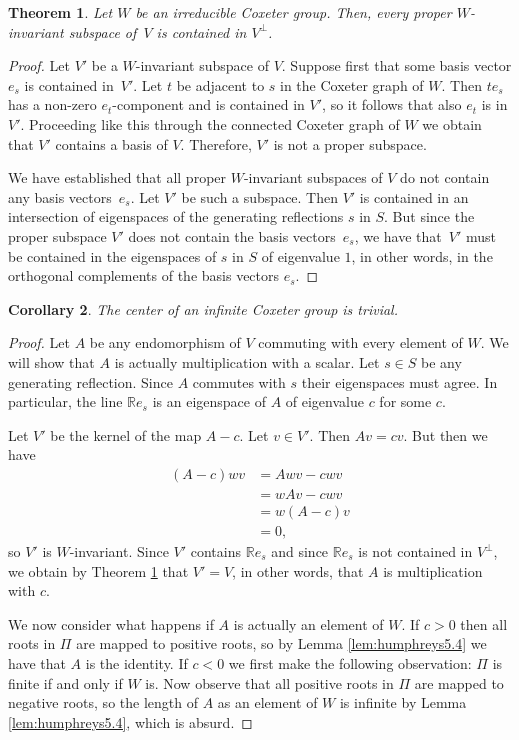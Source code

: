 \documentclass{article}
\newtheorem{theorem}{Theorem}[section]
\newtheorem{corollary}[theorem]{Corollary}
\theoremstyle{definition}
\begin{document}
\begin{theorem}\label{thm:invariant-subspaces}
Let $W$ be an irreducible Coxeter group. Then, every proper $W$-invariant subspace of~$V$ is contained in $V^\perp$.
\end{theorem}

\begin{proof}
Let $V'$ be a $W$-invariant subspace of $V$. Suppose first that some basis vector $e_s$ is contained in~$V'$. Let $t$ be adjacent to $s$ in the Coxeter graph of $W$. Then $te_s$ has a non-zero $e_t$-component and is contained in $V'$, so it follows that also $e_t$ is in $V'$. Proceeding like this through the connected Coxeter graph of $W$ we obtain that $V'$ contains a basis of $V$. Therefore, $V'$ is not a proper subspace.

We have established that all proper $W$-invariant subspaces of $V$ do not contain any basis vectors~$e_s$. Let $V'$ be such a subspace. Then $V'$ is contained in an intersection of eigenspaces of the generating reflections $s$ in $S$. But since the proper subspace $V'$ does not contain the basis vectors~$e_s$, we have that~$V'$ must be contained in the eigenspaces of $s$ in $S$ of eigenvalue $1$, in other words, in the orthogonal complements of the basis vectors $e_s$.
\end{proof}

\begin{corollary}
The center of an infinite Coxeter group is trivial.
\end{corollary}

\begin{proof}
Let $A$ be any endomorphism of $V$ commuting with every element of $W$. We will show that $A$ is actually multiplication with a scalar. Let $s \in S$ be any generating reflection. Since $A$ commutes with $s$ their eigenspaces must agree. In particular, the line $\mathbb{R}e_s$ is an eigenspace of $A$ of eigenvalue $c$ for some $c$. 

Let $V'$ be the kernel of the map $A-c$. Let $v \in V'$. Then $Av = cv$. But then we have
\begin{align*}
(A-c)wv & = Awv - cwv \\
& = wAv - cwv \\
& = w(A - c) v \\
& = 0,
\end{align*}
so $V'$ is $W$-invariant. Since $V'$ contains $\mathbb{R}e_s$ and since $\mathbb{R}e_s$ is not contained in $V^\perp$, we obtain by Theorem \ref{thm:invariant-subspaces} that $V' = V$, in other words, that $A$ is multiplication with $c$.

We now consider what happens if $A$ is actually an element of $W$. If $c > 0$ then all roots in $\Pi$ are mapped to positive roots, so by Lemma \ref{lem:humphreys5.4} we have that $A$ is the identity. If $c < 0$ we first make the following observation: $\Pi$ is finite if and only if $W$ is. Now observe that all positive roots in $\Pi$ are mapped to negative roots, so the length of $A$ as an element of $W$ is infinite by Lemma \ref{lem:humphreys5.4}, which is absurd.
\end{proof}
\end{document}
